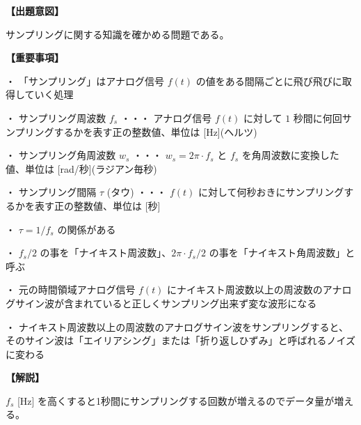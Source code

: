 \noindent \textbf{【出題意図】}

\noindent サンプリングに関する知識を確かめる問題である。

\vspace{1em}
\noindent \textbf{【重要事項】}

\medskip
\noindent ・ 「サンプリング」はアナログ信号 $f(t)$ の値をある間隔ごとに飛び飛びに取得していく処理

\medskip
\noindent ・ サンプリング周波数 $f_s$ ・・・ アナログ信号 $f(t)$ に対して $1$ 秒間に何回サンプリングするかを表す正の整数値、単位は [Hz](ヘルツ)

\medskip
\noindent ・ サンプリング角周波数 $w_s$ ・・・ $w_s = 2\pi\cdot f_s$ と $f_s$ を角周波数に変換した値、単位は [rad/秒](ラジアン毎秒)

\medskip
\noindent ・ サンプリング間隔 $\tau$ (タウ) ・・・ $f(t)$ に対して何秒おきにサンプリングするかを表す正の整数値、単位は [秒]

\medskip
\noindent ・ $\tau = 1/f_s$ の関係がある

\medskip
\noindent ・ $f_s/2$ の事を「ナイキスト周波数」、$2\pi \cdot f_s/2$ の事を「ナイキスト角周波数」と呼ぶ

\medskip
\noindent ・ 元の時間領域アナログ信号 $f(t)$ にナイキスト周波数以上の周波数のアナログサイン波が含まれていると正しくサンプリング出来ず変な波形になる

\medskip
\noindent ・ ナイキスト周波数以上の周波数のアナログサイン波をサンプリングすると、そのサイン波は「エイリアシング」または「折り返しひずみ」と呼ばれるノイズに変わる

\vspace{1em}
\noindent \textbf{【解説】}

\noindent $f_s$ [Hz] を高くすると1秒間にサンプリングする回数が増えるのでデータ量が増える。
